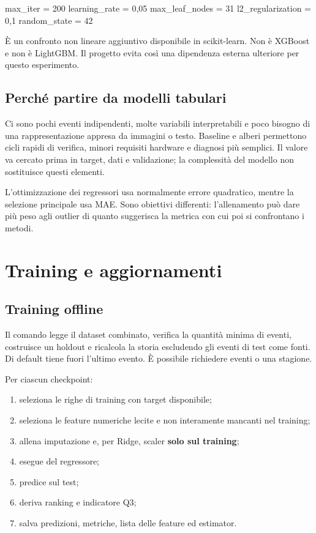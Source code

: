 \documentclass[11pt,a4paper]{article}
\providecommand{\tightlist}{\setlength{\itemsep}{0pt}\setlength{\parskip}{0pt}}
\newcommand{\code}[1]{{\ttfamily\small\seqsplit{#1}}}
\begin{document}
\begin{CodeBlock}
max_iter = 200
learning_rate = 0,05
max_leaf_nodes = 31
l2_regularization = 0,1
random_state = 42
\end{CodeBlock}

È un confronto non lineare aggiuntivo disponibile in scikit-learn. Non è XGBoost e non è LightGBM. Il progetto evita così una dipendenza esterna ulteriore per questo esperimento.

\subsection{Perché partire da modelli tabulari}\label{perchuxe9-partire-da-modelli-tabulari}

Ci sono pochi eventi indipendenti, molte variabili interpretabili e poco bisogno di una rappresentazione appresa da immagini o testo. Baseline e alberi permettono cicli rapidi di verifica, minori requisiti hardware e diagnosi più semplici. Il valore va cercato prima in target, dati e validazione; la complessità del modello non sostituisce questi elementi.

L'ottimizzazione dei regressori usa normalmente errore quadratico, mentre la selezione principale usa MAE. Sono obiettivi differenti: l'allenamento può dare più peso agli outlier di quanto suggerisca la metrica con cui poi si confrontano i metodi.

\section{Training e aggiornamenti}\label{training-e-aggiornamenti}

\subsection{Training offline}\label{training-offline}

Il comando \code{train-tabular-models} legge il dataset combinato, verifica la quantità minima di eventi, costruisce un holdout e ricalcola la storia escludendo gli eventi di test come fonti. Di default tiene fuori l'ultimo evento. È possibile richiedere eventi o una stagione.

Per ciascun checkpoint:

\begin{enumerate}
\def\labelenumi{\arabic{enumi}.}
\tightlist
\item
  seleziona le righe di training con target disponibile;
\item
  seleziona le feature numeriche lecite e non interamente mancanti nel training;
\item
  allena imputazione e, per Ridge, scaler \textbf{solo sul training};
\item
  esegue \code{fit} del regressore;
\item
  predice sul test;
\item
  deriva ranking e indicatore Q3;
\item
  salva predizioni, metriche, lista delle feature ed estimator.
\end{enumerate}
\end{document}
